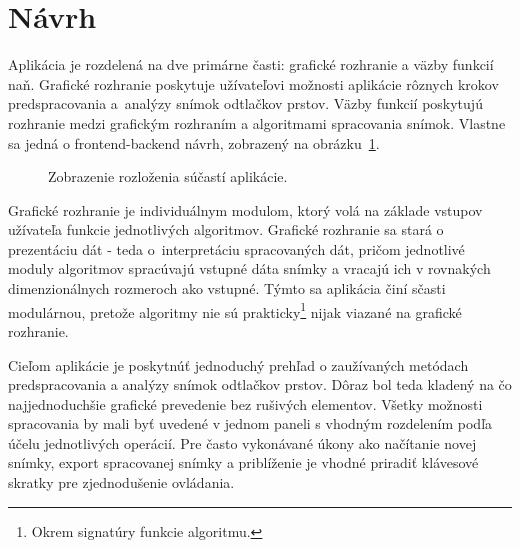   \section{Návrh}
  Aplikácia je rozdelená na dve primárne časti: grafické rozhranie a väzby funkcií naň. Grafické rozhranie poskytuje užívateľovi možnosti aplikácie
  rôznych krokov predspracovania a~analýzy snímok odtlačkov prstov. Väzby funkcií poskytujú rozhranie medzi grafickým rozhraním a algoritmami spracovania
  snímok. Vlastne sa jedná o frontend-backend návrh, zobrazený na obrázku~{\ref{obr:sucasti_app}}.

  \begin{figure}[h]
    \centering
    \caption{Zobrazenie rozloženia súčastí aplikácie.}
    \label{obr:sucasti_app}
  \end{figure}

  Grafické rozhranie je individuálnym modulom, ktorý volá na základe vstupov užívateľa funkcie jednotlivých algoritmov. Grafické rozhranie sa stará
  o prezentáciu dát - teda o~interpretáciu spracovaných dát, pričom jednotlivé moduly algoritmov spracúvajú vstupné dáta snímky a vracajú ich v rovnakých
  dimenzionálnych rozmeroch ako vstupné. Týmto sa aplikácia činí sčasti modulárnou, pretože algoritmy nie sú prakticky\footnote{Okrem signatúry funkcie
  algoritmu.} nijak viazané na grafické rozhranie.

  Cieľom aplikácie je poskytnúť jednoduchý prehľad o zaužívaných metódach predspracovania a analýzy snímok odtlačkov prstov. Dôraz bol teda kladený na
  čo najjednoduchšie grafické prevedenie bez rušivých elementov. Všetky možnosti spracovania by mali byť uvedené v jednom paneli s vhodným rozdelením podľa
  účelu jednotlivých operácií. Pre často vykonávané úkony ako načítanie novej snímky, export spracovanej snímky a priblíženie je vhodné priradiť
  klávesové skratky pre zjednodušenie ovládania.


